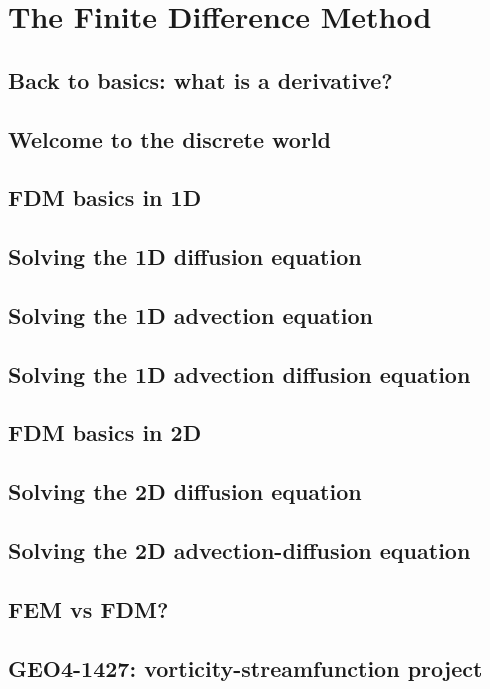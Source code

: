 \chapter{The Finite Difference Method} %

\section{Back to basics: what is a derivative?} 
\section{Welcome to the discrete world} 
\section{FDM basics in 1D} \label{ss:fdm_basics1D}  
\section{Solving the 1D diffusion equation} \label{ss:fdm_diff1D} 
\section{Solving the 1D advection equation} \label{ss:fdm_adv1D} 
\newpage
\section{Solving the 1D advection diffusion equation} 
\label{ss:fdm_advdiff1D} 
\newpage
\section{FDM basics in 2D} \label{ss:fdm_basics2D}  
\newpage
\section{Solving the 2D diffusion equation} \label{ss:fdm_diff2D} 
\section{Solving the 2D advection-diffusion equation} \label{ss:fdm_advdiff2D} 

\newpage
\section{FEM vs FDM?}\label{ss:femvsfdm}   
\newpage
\section{GEO4-1427: vorticity-streamfunction project} 
